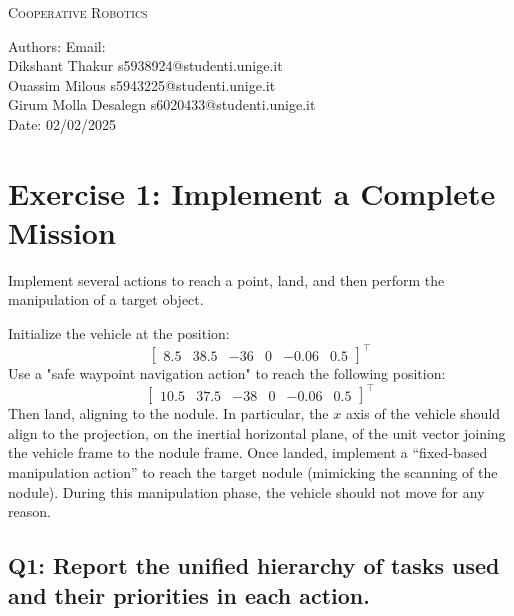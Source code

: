 \documentclass{article}
\makeatletter
\newcommand\frontmatter{%
    \cleardoublepage
  \pagenumbering{roman}}
\makeatother
\begin{document}
\frontmatter
\onecolumn 
\vskip 1cm
\begin{center}
\huge \textsc{Cooperative Robotics}\\
\vskip 1cm

\skip 0.5cm

\vskip 5cm

\normalsize
Authors:  \hspace{7cm} Email: \\  
Dikshant Thakur \hspace{6.8cm} s5938924@studenti.unige.it\\
Ouassim Milous \hspace{7cm}  s5943225@studenti.unige.it\\
Girum Molla Desalegn \hspace{6cm} s6020433@studenti.unige.it\\
\vskip 13cm
Date: 02/02/2025 \\
\end{center}
\clearpage
\section{Exercise 1: Implement a Complete Mission}
Implement several actions to reach a point, land, and then perform the manipulation of a target object.

Initialize the vehicle at the position:
\begin{displaymath}
	\begin{bmatrix} 8.5 & 38.5 & -36 & 0 & -0.06 & 0.5 \end{bmatrix}^\top
\end{displaymath} 
Use a "safe waypoint navigation action" to reach the following position: 
\begin{displaymath}
	\begin{bmatrix} 10.5 & 37.5 & -38 & 0 & -0.06 & 0.5 \end{bmatrix}^\top
\end{displaymath} 
Then land, aligning to the nodule. In particular, the $x$ axis of the vehicle should align to the projection, on the inertial horizontal plane, of the unit vector joining the vehicle frame to the nodule frame.
Once landed, implement a ``fixed-based manipulation action'' to reach the target nodule (mimicking the scanning of the nodule). During this manipulation phase, the vehicle should not move for any reason.



\subsection{Q1: Report the unified hierarchy of tasks used and their priorities in each action.}
\end{document}
